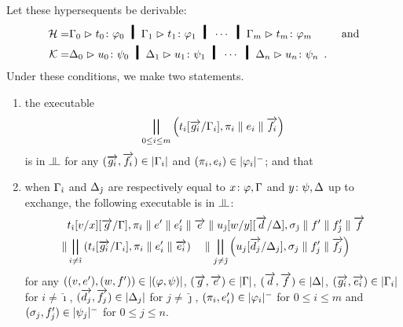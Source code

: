 \begin{proposition}[Adequacy]
 Let these hypersequents be derivable:
 \begin{align*}
  \Hy = &\sequent{\G_0}{\tj{t_0}{\phi_0}} \hmid
  \sequent{\G_1}{\tj{t_1}{\phi_1}} \hmid \cdots \hmid
  \sequent{\G_{m}}{\tj{t_{m}}{\phi_{m}}}
  &\text{ and}\\
  \Ky = &\sequent{\D_0}{\tj{u_0}{\psi_0}} \hmid
  \sequent{\D_1}{\tj{u_1}{\psi_1}} \hmid \cdots \hmid
  \sequent{\D_{n}}{\tj{u_{n}}{\psi_{n}}}\enspace.
 \end{align*}
 Under these conditions, we make two statements.
 \begin{enumerate}[label=(\arabic{*}), ref=\textit{(\arabic{*})}]
  \item \label{c:first} the executable
	\[
	\bigparallel_{0\le i\le m}
	\left(t_i[\overrightarrow{g_i}/\Gamma_i], \pi_i\parallel e_i\parallel \overrightarrow{f_i}\right)
	\]
	is in $\bbot$
	 for any
	$(\overrightarrow{g_i},\overrightarrow{f_i})\in|{\Gamma_i}|$ and $(\pi_i, e_i)\in|{\varphi_i}|^-$; and that
  \item \label{c:second}
	when $\Gamma_{\hat\imath}$ and $\Delta_{\hat\jmath}$ are respectively
	equal to ${x} \colon{\varphi}, \Gamma$ and ${y} \colon{\psi}, \Delta$ up to exchange,
	the following executable is in $\bbot$:
	\begin{align*}
	 &
	 t_{\hat\imath}[v/x][\overrightarrow{g}/\Gamma],\pi_{\hat\imath}
	 \parallel e'\parallel e'_{\hat\imath} \parallel \overrightarrow e\parallel
	 u_{\hat\jmath}[w/y][\overrightarrow d /\Delta],
	 \sigma_{\hat\jmath}\parallel f'\parallel f'_{\hat\jmath}\parallel \overrightarrow f \\ \parallel
	&\bigparallel_{i\neq\hat\imath} \left(t_i[\overrightarrow{g_i}/\Gamma_i],
	\pi_i\parallel e'_i\parallel \overrightarrow{e_i}\right)
	 \quad \parallel
	\bigparallel_{j\neq\hat\jmath} \left(u_j[\overrightarrow{d_j}/\Delta_j],
	\sigma_j\parallel f'_j\parallel {\overrightarrow{f_j}}\right)
	\end{align*}
	for any
	$((v,e'),(w,f'))    \in |{(\varphi,\psi)}|$,
	$(\overrightarrow{g},\overrightarrow{e})  \in |{\Gamma}|$,
	$(\overrightarrow d,\overrightarrow{f})   \in |{\Delta}|$,
	$(\overrightarrow{g_i},\overrightarrow{e_i})\in |{\Gamma_i}|$ for $i\neq\hat\imath$,
	$(\overrightarrow{d_j},\overrightarrow{f_j})\in |{\Delta_j}|$ for $j\neq\hat\jmath$,
	$(\pi_i,e'_i)    \in |{\varphi_i}|^-$   for $0\le i\le m$ and
	$(\sigma_j,f'_j) \in |{\psi_j}|^-$   for $0\le j\le n$.
  \end{enumerate}
 \end{proposition}
